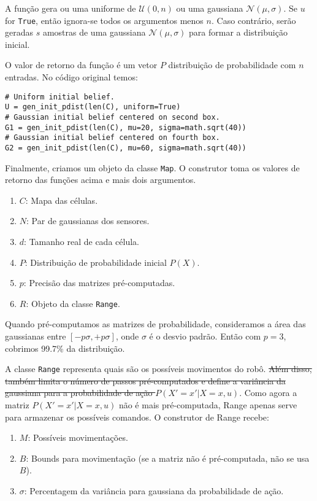 \documentclass[12pt]{article}
\theoremstyle{plain}
\numberwithin{equation}{section}
\newcommand{\code}[1]{\lstinline[mathescape=true]{#1}}
\begin{document}
A função gera ou uma uniforme de $\mathcal{U}(0, n)$ ou uma gaussiana $\mathcal{N}(\mu,\sigma)$. Se
$u$ for \code{True}, então ignora-se todos os argumentos menos $n$. Caso contrário, serão geradas
$s$ amostras de uma gaussiana $\mathcal{N}(\mu,\sigma)$ para formar a distribuição inicial.

O valor de retorno da função é um vetor $P$ distribuição de probabilidade com $n$ entradas. No
código original temos:\\

\begin{lstlisting}
# Uniform initial belief.
U = gen_init_pdist(len(C), uniform=True)
# Gaussian initial belief centered on second box.
G1 = gen_init_pdist(len(C), mu=20, sigma=math.sqrt(40))
# Gaussian initial belief centered on fourth box.
G2 = gen_init_pdist(len(C), mu=60, sigma=math.sqrt(40))
\end{lstlisting}

Finalmente, criamos um objeto da classe \code{Map}. O construtor toma os valores de retorno das
funções acima e mais dois argumentos.

\begin{enumerate}
  \item $C$: Mapa das células.
  \item $N$: Par de gaussianas dos sensores.
  \item $d$: Tamanho real de cada célula.
  \item $P$: Distribuição de probabilidade inicial $P(X)$.
  \item $p$: Precisão das matrizes pré-computadas.
  \item $R$: Objeto da classe \code{Range}.
\end{enumerate}

Quando pré-computamos as matrizes de probabilidade, consideramos a área das gaussianas entre
$[-p\sigma,+p\sigma]$, onde $\sigma$ é o desvio padrão. Então com $p=3$, cobrimos 99.7\% da
distribuição.

A classe \code{Range} representa quais são os possíveis movimentos do robô. \sout{Além disso, também
limita o número de passos pré-computados e define a variância da gaussiana para a probabilidade de
ação $P(X'=x'|X=x,u)$}. Como agora a matriz $P(X'=x'|X=x,u)$ não é mais pré-computada, Range apenas
serve para armazenar os possíveis comandos. O construtor de Range recebe:

\begin{enumerate}
  \item $M$: Possíveis movimentações.
  \item $B$: Bounds para movimentação (se a matriz não é pré-computada, não se usa $B$).
  \item $\sigma$: Percentagem da variância para gaussiana da probabilidade de ação.
\end{enumerate}
\end{document}
